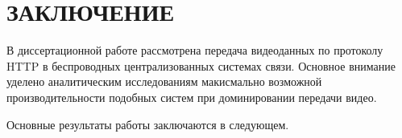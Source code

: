 \chapter*{ЗАКЛЮЧЕНИЕ}						%


В диссертационной работе рассмотрена передача видеоданных по протоколу HTTP в беспроводных централизованных системах связи. Основное внимание уделено аналитическим исследованиям макисмально возможной производительности подобных систем при доминировании передачи видео.

Основные результаты работы заключаются в следующем.

